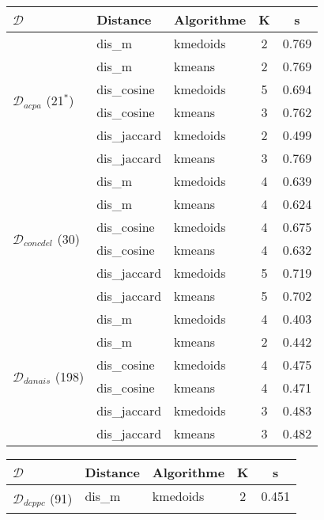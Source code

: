 \begin{table}[!htb]
	\scriptsize
	\begin{subfigure}[ht]{0.49\textwidth}
	\begin{tabular}[pos]{|l|l|l|c|c|}
		\hline
		$\mathcal{D}$& \textbf{Distance} & \textbf{Algorithme}& \textbf{K}  & \textbf{s}  \\ \hline
	\multirow{6}{\mrcell}{$\mathcal{D}_{acpa}$ (21$^*$)} & dis\_m & kmedoids & 2 & 0.769  \\ \cline{2-5}
	& dis\_m & kmeans & 2 & 0.769 \\ \cline{2-5}
	& dis\_cosine & kmedoids & 5 & 0.694 \\ \cline{2-5}
	& dis\_cosine & kmeans & 3 & 0.762  \\ \cline{2-5}
	& dis\_jaccard & kmedoids & 2 & 0.499  \\ \cline{2-5}
	& dis\_jaccard & kmeans & 3 & 0.769 \\ \hline
	\multirow{6}{\mrcell}{$\mathcal{D}_{concdel}$ (30)}  & dis\_m & kmedoids & 4 & 0.639  \\ \cline{2-5}
	& dis\_m & kmeans & 4 & 0.624  \\ \cline{2-5}
	& dis\_cosine & kmedoids & 4 & 0.675  \\ \cline{2-5}
	& dis\_cosine & kmeans & 4 & 0.632  \\ \cline{2-5}
	& dis\_jaccard & kmedoids & 5 & 0.719  \\ \cline{2-5}
	& dis\_jaccard & kmeans & 5 & 0.702\\ \hline
	\multirow{6}{\mrcell}{$\mathcal{D}_{danais}$ (198)} 
	& dis\_m & kmedoids & 4 & 0.403  \\ \cline{2-5}
	& dis\_m & kmeans & 2 & 0.442  \\ \cline{2-5}
	& dis\_cosine & kmedoids & 4 & 0.475 \\ \cline{2-5}
	& dis\_cosine & kmeans & 4 & 0.471  \\ \cline{2-5}
	& dis\_jaccard & kmedoids & 3 & 0.483 \\ \cline{2-5}
	& dis\_jaccard & kmeans & 3 & 0.482 \\ \hline
\end{tabular}
	\end{subfigure}
	\begin{subfigure}[ht]{0.49\textwidth}
		\begin{tabular}[pos]{|l|l|l|c|c|}
			\hline
			$\mathcal{D}$& \textbf{Distance} & \textbf{Algorithme}& \textbf{K}  & \textbf{s}  \\ \hline
	\multirow{6}{\mrcell}{$\mathcal{D}_{dcppc}$ (91)} & dis\_m & kmedoids & 2 & 0.451  \\ \cline{2-5}

\end{tabular}
\end{subfigure}
\end{table}
